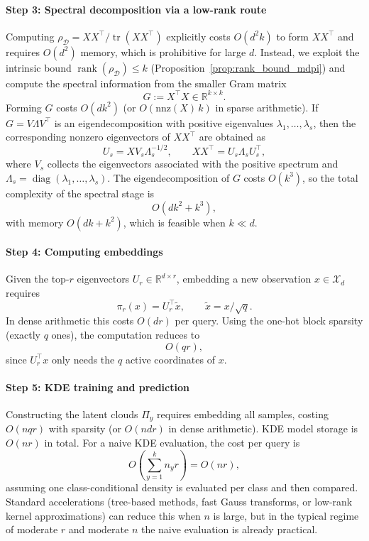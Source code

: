 \documentclass[preprint,11pt]{elsarticle}
\newcommand{\tr}{\operatorname{tr}}
\newcommand{\rank}{\operatorname{rank}}
\newcommand{\R}{\mathbb{R}}
\newcommand{\diag}{\operatorname{diag}}
\begin{document}
\paragraph{Step 3: Spectral decomposition via a low-rank route}
Computing $\rho_{\mathcal D}=XX^\top/\tr(XX^\top)$ explicitly costs $O(d^2k)$ to form $XX^\top$ and requires $O(d^2)$ memory,
which is prohibitive for large $d$.
Instead, we exploit the intrinsic bound $\rank(\rho_{\mathcal D})\le k$ (Proposition~\ref{prop:rank_bound_mdpi}) and compute
the spectral information from the smaller Gram matrix
\[
G := X^\top X \in \R^{k\times k}.
\]
Forming $G$ costs $O(dk^2)$ (or $O(\mathrm{nnz}(X)\,k)$ in sparse arithmetic).
If $G=V\Lambda V^\top$ is an eigendecomposition with positive eigenvalues $\lambda_1,\dots,\lambda_s$, then the corresponding
nonzero eigenvectors of $XX^\top$ are obtained as
\[
U_s = X V_s \Lambda_s^{-1/2},
\qquad
XX^\top = U_s \Lambda_s U_s^\top,
\]
where $V_s$ collects the eigenvectors associated with the positive spectrum and $\Lambda_s=\diag(\lambda_1,\dots,\lambda_s)$.
The eigendecomposition of $G$ costs $O(k^3)$, so the total complexity of the spectral stage is
\[
O(dk^2+k^3),
\]
with memory $O(dk+k^2)$, which is feasible when $k\ll d$.

\paragraph{Step 4: Computing embeddings}
Given the top-$r$ eigenvectors $U_r\in\R^{d\times r}$, embedding a new observation $x\in\mathcal X_d$ requires
\[
\pi_r(x)=U_r^\top \widetilde x,
\qquad \widetilde x=x/\sqrt{q}.
\]
In dense arithmetic this costs $O(dr)$ per query.
Using the one-hot block sparsity (exactly $q$ ones), the computation reduces to
\[
O(qr),
\]
since $U_r^\top x$ only needs the $q$ active coordinates of $x$.

\paragraph{Step 5: KDE training and prediction}
Constructing the latent clouds $\Pi_y$ requires embedding all samples, costing $O(nqr)$ with sparsity (or $O(ndr)$ in dense arithmetic).
KDE model storage is $O(nr)$ in total.
For a naive KDE evaluation, the cost per query is
\[
O\!\left(\sum_{y=1}^k n_y r\right)=O(nr),
\]
assuming one class-conditional density is evaluated per class and then compared.
Standard accelerations (tree-based methods, fast Gauss transforms, or low-rank kernel approximations) can reduce this
when $n$ is large, but in the typical regime of moderate $r$ and moderate $n$ the naive evaluation is already practical.
\end{document}
